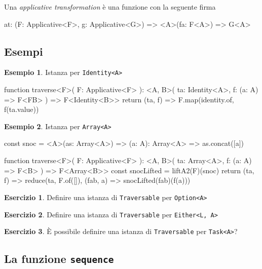 \documentclass[12pt]{article}
\theoremstyle{definition}
\newtheorem{example}{Esempio}[section]
\newtheorem{exercise}{Esercizio}[section]
\newenvironment{code}
  {\vspace{0.5cm} \VerbatimEnvironment\begin{typescriptcode}}
  {\end{typescriptcode} \vspace{0.2cm}}
\begin{document}
Una \emph{applicative transformation} è una funzione con la seguente firma

\begin{code}
at: (F: Applicative<F>, g: Applicative<G>) =>
  <A>(fa: F<A>) => G<A>
\end{code}

\subsection{Esempi}

\begin{example}
Istanza per \texttt{Identity<A>}

\begin{code}
function traverse<F>(
  F: Applicative<F>
): <A, B>(
  ta: Identity<A>,
  f: (a: A) => F<FB>
) => F<Identity<B>> {
  return (ta, f) => F.map(identity.of, f(ta.value))
}
\end{code}
\end{example}

\begin{example}
Istanza per \texttt{Array<A>}

\begin{code}
const snoc = <A>(as: Array<A>) => (a: A): Array<A> =>
  as.concat([a])

function traverse<F>(
  F: Applicative<F>
): <A, B>(
  ta: Array<A>,
  f: (a: A) => F<B>
) => F<Array<B>> {
  const snocLifted = liftA2(F)(snoc)
  return (ta, f) =>
    reduce(ta, F.of([]), (fab, a) => snocLifted(fab)(f(a)))
}
\end{code}
\end{example}

\begin{exercise}
Definire una istanza di \texttt{Traversable} per \texttt{Option<A>}
\end{exercise}

\begin{exercise}
Definire una istanza di \texttt{Traversable} per \texttt{Either<L, A>}
\end{exercise}

\begin{exercise}
È possibile definire una istanza di \texttt{Traversable} per \texttt{Task<A>}?
\end{exercise}

\subsection{La funzione \texttt{sequence}}
\end{document}
